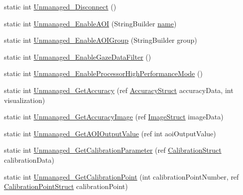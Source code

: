 \begin{DoxyCompactItemize}
static int \hyperlink{class_web_analyzer_1_1_eye_tracking_1_1_eye_tracking_controller_a7a9c03210ec2453f1c3d0afc885f669a}{Unmanaged\+\_\+\+Disconnect} ()
\item 
static int \hyperlink{class_web_analyzer_1_1_eye_tracking_1_1_eye_tracking_controller_acde9f6d86e8b1c9d797da2cb6cdf2ca3}{Unmanaged\+\_\+\+Enable\+A\+O\+I} (String\+Builder \hyperlink{_u_i_2_h_t_m_l_resources_2js_2src_2create__experiment_8js_adac2bcb4f01b574cbc63fe8ee2c56bf0}{name})
\item 
static int \hyperlink{class_web_analyzer_1_1_eye_tracking_1_1_eye_tracking_controller_acaa79b92d47c6f0518cd17d6014fc0f1}{Unmanaged\+\_\+\+Enable\+A\+O\+I\+Group} (String\+Builder group)
\item 
static int \hyperlink{class_web_analyzer_1_1_eye_tracking_1_1_eye_tracking_controller_a03c27615c5818dcd7f81461498c43409}{Unmanaged\+\_\+\+Enable\+Gaze\+Data\+Filter} ()
\item 
static int \hyperlink{class_web_analyzer_1_1_eye_tracking_1_1_eye_tracking_controller_a8c024a1ba1083c689cd48942f91389bf}{Unmanaged\+\_\+\+Enable\+Processor\+High\+Performance\+Mode} ()
\item 
static int \hyperlink{class_web_analyzer_1_1_eye_tracking_1_1_eye_tracking_controller_a699265d5143beda24917af96137c33c1}{Unmanaged\+\_\+\+Get\+Accuracy} (ref \hyperlink{struct_web_analyzer_1_1_eye_tracking_1_1_eye_tracking_controller_1_1_accuracy_struct}{Accuracy\+Struct} accuracy\+Data, int visualization)
\item 
static int \hyperlink{class_web_analyzer_1_1_eye_tracking_1_1_eye_tracking_controller_aaa5c249abf296a2709c3eb46c0aeb5d9}{Unmanaged\+\_\+\+Get\+Accuracy\+Image} (ref \hyperlink{struct_web_analyzer_1_1_eye_tracking_1_1_eye_tracking_controller_1_1_image_struct}{Image\+Struct} image\+Data)
\item 
static int \hyperlink{class_web_analyzer_1_1_eye_tracking_1_1_eye_tracking_controller_a3ab8eb4d0a08c39cf201dbf746321db3}{Unmanaged\+\_\+\+Get\+A\+O\+I\+Output\+Value} (ref int aoi\+Output\+Value)
\item 
static int \hyperlink{class_web_analyzer_1_1_eye_tracking_1_1_eye_tracking_controller_a031a2041c1c7cc5a5ecb1b0174cdc266}{Unmanaged\+\_\+\+Get\+Calibration\+Parameter} (ref \hyperlink{struct_web_analyzer_1_1_eye_tracking_1_1_eye_tracking_controller_1_1_calibration_struct}{Calibration\+Struct} calibration\+Data)
\item 
static int \hyperlink{class_web_analyzer_1_1_eye_tracking_1_1_eye_tracking_controller_a5bca80a2e1df0a4ccfad784845d0f3f4}{Unmanaged\+\_\+\+Get\+Calibration\+Point} (int calibration\+Point\+Number, ref \hyperlink{struct_web_analyzer_1_1_eye_tracking_1_1_eye_tracking_controller_1_1_calibration_point_struct}{Calibration\+Point\+Struct} calibration\+Point)

\end{DoxyCompactItemize}
